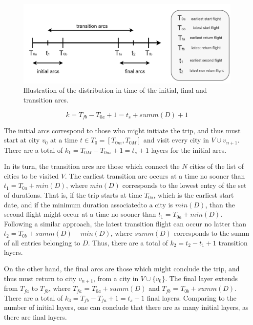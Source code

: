 
\begin{figure}[htpb]
  \centering
  \includegraphics[width=\textwidth]{./Figures/system_design/flights_times.png}
  \caption{Illustration of the distribution in time of the initial, final and transition arcs.}
  \label{fig:multipartite_times}  
\end{figure}


\begin{equation}
\label{eq:k_number_layers}
  k = T_{fb} - T_{0a} + 1 = t_s + summ(D) + 1
\end{equation}

The initial arcs correspond to those who might initiate the trip,
and thus must start at city $v_0$ at a time $t \in T_0 = [T_{0m}, T_{0M}]$
and visit every city in $V \cup {v_{n+1}}$.
There are a total of $k_1 = T_{0M} - T_{0m} + 1 = t_s + 1$ layers for the initial arcs.

In its turn, the transition arcs are those which connect the $N$ cities 
of the list of cities to be visited $V$.
The earliest transition arc occurs at a time no sooner than $t_1 = T_{0a} + min(D)$,
where $min(D)$ corresponds to the lowest entry of the set of durations.
That is, if the trip starts at time $T_{0a}$, which is the earliest start date,
and if the minimum duration associatedto a city is $min(D)$, 
than the second flight might occur at a time no sooner than $t_1 = T_{0a} + min(D)$.
Following a similar approach, the latest transition flight can 
occur no latter than $t_2 = T_{0b} + summ(D) - min(D)$, where $summ(D)$ corresponds 
to the summ of all entries belonging to $D$.
Thus, there are a total of $k_2 = t_2-t_1+1$ transition layers.

On the other hand, the final arcs are those which might conclude the trip,
and thus must return to city $v_{n+1}$,
from a city in $V \cup \{v_0\}$. The final layer extends from 
$T_{fa}$ to $T_{fb}$, where $T_{fa}$ = $T_{0a} + summ(D)$ and $T_{fb}$ = $T_{0b} + summ(D)$.
There are a total of $k_3 = T_{fb} - T_{fa} + 1 = t_s + 1 $ final layers.
Comparing to the number of initial layers, one can conclude that there are as many 
initial layers, as there are final layers. 

